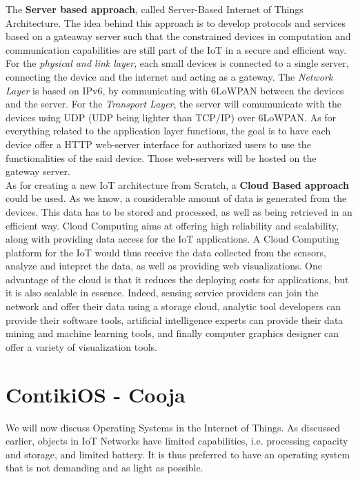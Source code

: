 The \textbf{Server based approach}, called Server-Based Internet of Things Architecture. The idea behind this approach is to develop protocols and services based on a gateaway server such that the constrained devices in computation and communication capabilities are still part of the IoT in a secure and efficient way. For the \textit{physical and link layer}, each small devices is connected to a single server, connecting the device and the internet and acting as a gateway. The \textit{Network Layer} is based on IPv6, by communicating with 6LoWPAN between the devices and the server. For the \textit{Transport Layer}, the server will comumunicate with the devices using UDP (UDP being lighter than TCP/IP) over 6LoWPAN. As for everything related to the application layer functions, the goal is to have each device offer a HTTP web-server interface for authorized users to use the functionalities of the said device. Those web-servers will be hosted on the gateway server.\\

As for creating a new IoT architecture from Scratch, a \textbf{Cloud Based approach} could be used. As we know, a considerable amount of data is generated from the devices. This data has to be stored and processed, as well as being retrieved in an efficient way. Cloud Computing aims at offering high reliability and scalability, along with providing data access for the IoT applications. A Cloud Computing platform for the IoT would thus receive the data collected from the sensors, analyze and intepret the data, as well as providing web visualizations. One advantage of the cloud is that it reduces the deploying costs for applications, but it is also scalable in essence. Indeed, sensing service providers can join the network and offer their data using a storage cloud, analytic tool developers can provide their software tools, artificial intelligence experts can provide their data mining and machine learning tools, and finally computer graphics designer can offer a variety of visualization tools.




\chapter{ContikiOS - Cooja}

We will now discuss Operating Systems in the Internet of Things. As discussed earlier, objects in IoT Networks have limited capabilities, i.e. processing capacity and storage, and limited battery. It is thus preferred to have an operating system that is not demanding and as light as possible. \\

